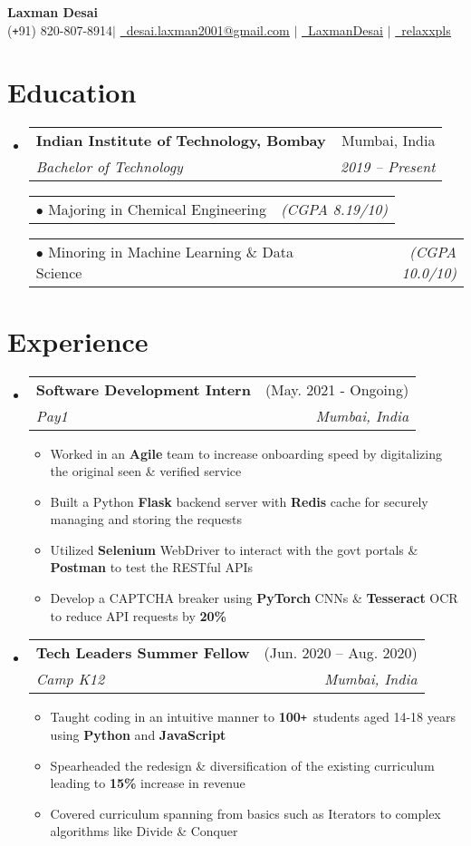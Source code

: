 \documentclass[a4paper,11pt]{article}
\makeatletter
\def\Plus{\texttt{+}}
\newcommand{\resumeItem}[1]{
  \item\small{
    {#1 \vspace{-2pt}}
  }
}
\newcommand{\resumeSubheading}[4]{
  \vspace{-2pt}\item
    \begin{tabular*}{\textwidth}[t]{l@{\extracolsep{\fill}}r}
      \textbf{#1} & #2 \\
      \textit{\small#3} & \textit{\small #4} \\
    \end{tabular*}\vspace{-7pt}
}
\newcommand{\resumeSubHeadingListStart}{\begin{itemize}[leftmargin=-0pt, label={}]}
\newcommand{\resumeSubHeadingListEnd}{\end{itemize}}
\newcommand{\resumeItemListStart}{\begin{itemize}}
\newcommand{\resumeItemListEnd}{\end{itemize}\vspace{-5pt}}
\newcommand{\resumeItemAlt}[2]{
  \begin{tabular*}{0.977\textwidth}{l@{\extracolsep{\fill}}r}
    \tiny $\bullet$ \hspace{2pt} \small #1 & \footnotesize \textit{#2} \\
  \end{tabular*}
}
\newcommand{\resumeItemAltListStart}{\begin{adjustwidth}{10.8pt}{}}
\newcommand{\resumeItemAltListEnd}{\end{adjustwidth}}
\makeatother
\begin{document}

\newcommand{\name}{Laxman Desai}
\newcommand{\email}{desai.laxman2001@gmail.com}
\newcommand{\contact}{(\Plus 91) 820-807-8914}
\newcommand{\GithubUsername}{relaxxpls}
\newcommand{\LinkedinUsername}{LaxmanDesai}

\begin{center}
	\textbf{\Huge \name} \\ \vspace{10pt}
	\small \faMobile* \contact \quad$|$\quad
	\href{mailto:\email}{\faEnvelope\ \underline{\email}} \quad$|$\quad
	\href{https://linkedin.com/in/\LinkedinUsername}{\faLinkedin\ \underline{\LinkedinUsername}} \quad$|$\quad
	\href{https://github.com/\GithubUsername}{\faGithub\ \underline{\GithubUsername}}
\end{center}

\section{Education}
\resumeSubHeadingListStart
  \resumeSubheading
  {Indian Institute of Technology, Bombay}{Mumbai, India}
  {Bachelor of Technology}{2019 -- Present}
  \resumeItemAltListStart
    \resumeItemAlt{Majoring in Chemical Engineering}{(CGPA 8.19/10)}
    \resumeItemAlt{Minoring in Machine Learning \& Data Science}{(CGPA 10.0/10)}
  \resumeItemAltListEnd
\resumeSubHeadingListEnd


\section{Experience}
\resumeSubHeadingListStart
  \resumeSubheading
  {Software Development Intern}{(May. 2021 - Ongoing)}
  {Pay1}{Mumbai, India}
  \resumeItemListStart
    \resumeItem{Worked in an \textbf{Agile} team to increase onboarding speed by digitalizing the original seen \& verified service}
    \resumeItem{Built a Python \textbf{Flask} backend server with \textbf{Redis} cache for securely managing and storing the requests}
    \resumeItem{Utilized \textbf{Selenium} WebDriver to interact with the govt portals \& \textbf{Postman} to test the RESTful APIs} 
    \resumeItem{Develop a CAPTCHA breaker using \textbf{PyTorch} CNNs \& \textbf{Tesseract} OCR to reduce API requests by \textbf{20\%}}
  \resumeItemListEnd

  \resumeSubheading
  {Tech Leaders Summer Fellow}{(Jun. 2020 -- Aug. 2020)}
  {Camp K12}{Mumbai, India}
  \resumeItemListStart
    \resumeItem{Taught coding in an intuitive manner to \textbf{100}\Plus\ students aged 14\hspace{2pt}-\hspace{1pt}18 years using \textbf{Python} and \textbf{JavaScript}}
    \resumeItem{Spearheaded the redesign \& diversification of the existing curriculum leading to \textbf{15\%} increase in revenue}
    \resumeItem{Covered curriculum spanning from basics such as Iterators to complex algorithms like Divide \& Conquer}
  \resumeItemListEnd
\resumeSubHeadingListEnd
\end{document}
